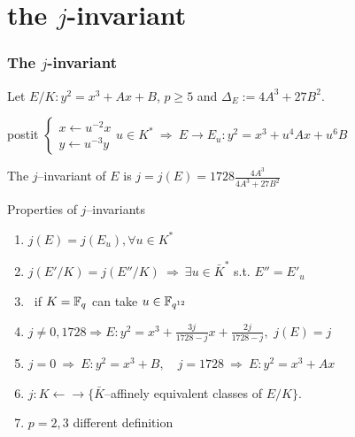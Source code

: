 \documentclass[10pt,handout]{beamer} %
\begin{document}
\section{the \texorpdfstring{$j$}{j}-invariant}
\begin{frame}
\frametitle{The $j$-invariant}
Let  $E/K: y^2=x^3+Ax+B$, $p\ge5$ and $\Delta_E:=4A^3+27B^2$. \pause

\begin{beamercolorbox}[shadow=true,center,rounded=true,wd=9.2cm]{postit} $\begin{cases}
x\longleftarrow u^{-2} x\\
y\longleftarrow u^{-3} y
  \end{cases} u\in K^*\ \Rightarrow\ E\longrightarrow E_u: y^2=x^3+u^4Ax+u^6B$
  \end{beamercolorbox}\pause

\begin{definition} The $j$--invariant of $E$ is
$j=j(E)=1728\frac{4A^3}{4A^3+27B^2}$
\end{definition}

\begin{beamerboxesrounded}[upper=block title example,lower=block body alerted,shadow=true]{Properties of
$j$--invariants}
\begin{enumerate}[<+-| alert@+>]
  \item $j(E)=j(E_u), \forall u\in K^*$
  \item $j(E'/K)=j(E''/K)\ \Rightarrow\ \exists u\in\bar{K}^*$ s.t. $E''=E'_u$
  \item[\ ] \ \hfill if $K=\mathbb F_q$ can take $u\in\mathbb F_{q^{12}}$
  \item $j\ne 0,1728\Rightarrow E: y^2=x^3+\frac{3j}{1728-j}x+\frac{2j}{1728-j},$ $j(E)=j$
  \item $j=0\ \Rightarrow\ E: y^2=x^3+B,\quad j=1728\ \Rightarrow\ E: y^2=x^3+Ax$
  \item $j: K\leftarrow\!\rightarrow\{\bar{K}$--affinely
  equivalent classes of $E/K\}$.
  \item $p=2, 3$ different definition
\end{enumerate}
\end{beamerboxesrounded}
\end{frame}
\end{document}
